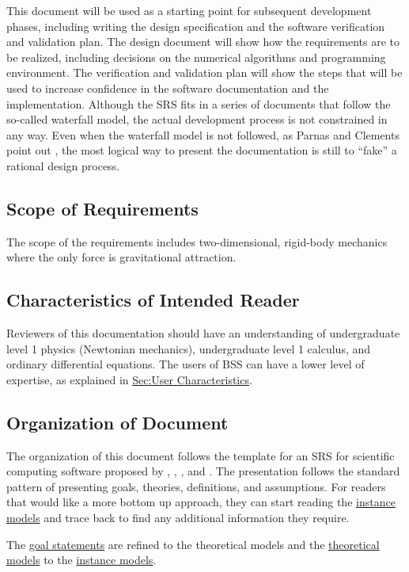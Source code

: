 \documentclass[12pt]{article}
\begin{document}
This document will be used as a starting point for subsequent development phases, including writing the design specification and the software verification and validation plan. The design document will show how the requirements are to be realized, including decisions on the numerical algorithms and programming environment. The verification and validation plan will show the steps that will be used to increase confidence in the software documentation and the implementation. Although the SRS fits in a series of documents that follow the so-called waterfall model, the actual development process is not constrained in any way. Even when the waterfall model is not followed, as Parnas and Clements point out \cite{parnasClements1986}, the most logical way to present the documentation is still to ``fake'' a rational design process.

\subsection{Scope of Requirements}
\label{Sec:ReqsScope}
The scope of the requirements includes two-dimensional, rigid-body mechanics where the only force is gravitational attraction.

\subsection{Characteristics of Intended Reader}
\label{Sec:ReaderChars}
Reviewers of this documentation should have an understanding of undergraduate level 1 physics (Newtonian mechanics), undergraduate level 1 calculus, and ordinary differential equations. The users of BSS can have a lower level of expertise, as explained in \hyperref[Sec:UserChars]{Sec:User Characteristics}.

\subsection{Organization of Document}
\label{Sec:DocOrg}
The organization of this document follows the template for an SRS for scientific computing software proposed by \cite{koothoor2013}, \cite{smithLai2005}, \cite{smithEtAl2007}, and \cite{smithKoothoor2016}. The presentation follows the standard pattern of presenting goals, theories, definitions, and assumptions. For readers that would like a more bottom up approach, they can start reading the \hyperref[Sec:IMs]{instance models} and trace back to find any additional information they require.

The \hyperref[Sec:GoalStmt]{goal statements} are refined to the theoretical models and the \hyperref[Sec:TMs]{theoretical models} to the \hyperref[Sec:IMs]{instance models}.
\end{document}
